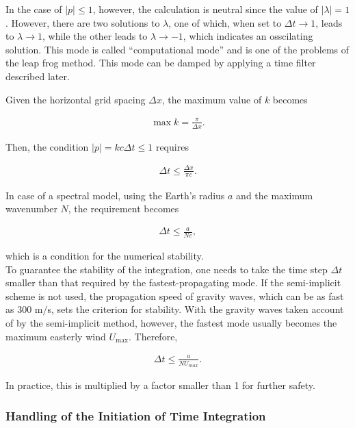 In the case of \(|p| \le 1\), however, the calculation is neutral since the value of \(|\lambda| = 1\). However, there are two solutions to \(\lambda\), one of which, when set to
\(\Delta t \rightarrow 1\), leads to \(\lambda \rightarrow 1\), while the other leads to \(\lambda \rightarrow -1\), which indicates an osscilating solution. This mode is called ``computational mode''
and is one of the problems of the leap frog method. This mode can be damped by applying a time filter described later.

Given the horizontal grid spacing \(\Delta x\), the maximum value of \(k\) becomes

\begin{eqnarray}
\max k = \frac{\pi}{\Delta x}.
\end{eqnarray}

Then, the condition \(|p|=kc \Delta t \le 1\) requires

\begin{eqnarray}
\Delta t \le \frac{\Delta x}{\pi c}.
\end{eqnarray}

In case of a spectral model, using the Earth's radius \(a\) and the maximum wavenumber \(N\), the requirement becomes

\begin{eqnarray}
\Delta t \le \frac{a}{N c},
\end{eqnarray}

which is a condition for the numerical stability.\\
To guarantee the stability of the integration, one needs to take the time step \(\Delta t\) smaller than that required by the fastest-propagating mode. If the semi-implicit scheme is not used, the
propagation speed of gravity waves, which can be as fast as 300 m\(/\)s, sets the criterion for stability. With the gravity waves taken account of by the semi-implicit method, however, the fastest
mode usually becomes the maximum easterly wind \(U_{\mathrm{max}}\). Therefore,

\begin{eqnarray}
\Delta t \le \frac{a}{N U_{max}} .
\end{eqnarray}

In practice, this is multiplied by a factor smaller than 1 for further safety.

\hypertarget{handling-of-the-initiation-of-time-integration}{%
\subsubsection{Handling of the Initiation of Time Integration}\label{handling-of-the-initiation-of-time-integration}}

